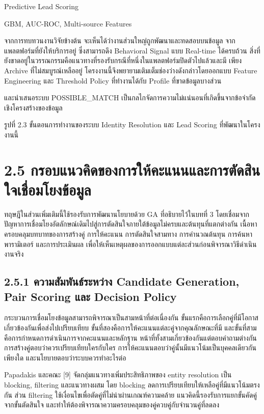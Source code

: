 \documentclass[12pt,a4paper]{report}
\begin{document}
Predictive Lead Scoring\par
GBM, AUC-ROC, Multi-source Features\par
จากการทบทวนงานวิจัยข้างต้น จะเห็นได้ว่างานส่วนใหญ่ถูกพัฒนาและทดสอบบนข้อมูล จากแพลตฟอร์มที่ยังให้บริการอยู่ ซึ่งสามารถดึง Behavioral Signal แบบ Real-time ได้ครบถ้วน สิ่งที่ยังขาดอยู่ในวรรณกรรมคือแนวทางที่รองรับกรณีที่หนึ่งในแพลตฟอร์มปิดตัวไปแล้วและมี เพียง Archive ที่ไม่สมบูรณ์เหลืออยู่ โครงงานนี้จึงพยายามเติมเต็มช่องว่างดังกล่าวโดยออกแบบ Feature Engineering และ Threshold Policy ที่ทำงานได้กับ Profile ที่ขาดข้อมูลบางส่วน\par
\clearpage
และนำเสนอระบบ POSSIBLE\_MATCH เป็นกลไกจัดการความไม่แน่นอนที่เกิดขึ้นจากข้อจำกัด เชิงโครงสร้างของข้อมูล\par
\begin{center}\small รูปที่ 2.3 ขั้นตอนการทำงานของระบบ Identity Resolution และ Lead Scoring ที่พัฒนาในโครงงานนี้\end{center}
\clearpage
\section*{2.5 กรอบแนวคิดของการให้คะแนนและการตัดสินใจเชื่อมโยงข้อมูล}
ทฤษฎีในส่วนเพิ่มเติมนี้ใช้รองรับการพัฒนานโยบายด้วย GA ที่อธิบายไว้ในบทที่ 3 โดยเชื่อมจากปัญหาการเชื่อมโยงอัตลักษณ์เดิมไปสู่การตัดสินใจภายใต้ข้อมูลไม่ครบและต้นทุนที่แตกต่างกัน เนื้อหาครอบคลุมบทบาทของการสร้างคู่ การให้คะแนน การตัดสินใจสามทาง การคำนวณต้นทุน การค้นหาพารามิเตอร์ และการประเมินผล เพื่อให้เห็นเหตุผลของการออกแบบแต่ละส่วนก่อนพิจารณาวิธีดำเนินงานจริง

\subsection*{2.5.1 ความสัมพันธ์ระหว่าง Candidate Generation, Pair Scoring และ Decision Policy}
กระบวนการเชื่อมโยงข้อมูลสามารถพิจารณาเป็นสามหน้าที่ต่อเนื่องกัน ขั้นแรกคือการเลือกคู่ที่มีโอกาสเกี่ยวข้องกันเพื่อส่งไปเปรียบเทียบ ขั้นที่สองคือการให้คะแนนแต่ละคู่จากคุณลักษณะที่มี และขั้นที่สามคือการกำหนดการดำเนินการจากคะแนนและหลักฐาน หน้าที่ทั้งสามเกี่ยวข้องกันแต่ตอบคำถามต่างกัน การสร้างคู่ตอบว่าควรเปรียบเทียบใครกับใคร การให้คะแนนตอบว่าคู่นั้นมีแนวโน้มเป็นบุคคลเดียวกันเพียงใด และนโยบายตอบว่าระบบควรทำอะไรต่อ

Papadakis และคณะ [9] จัดกลุ่มแนวทางเพิ่มประสิทธิภาพของ entity resolution เป็น blocking, filtering และแนวทางผสม โดย blocking ลดการเปรียบเทียบให้เหลือคู่ที่มีแนวโน้มตรงกัน ส่วน filtering ใช้เงื่อนไขเพื่อตัดคู่ที่ไม่น่าผ่านเกณฑ์ความคล้าย แนวคิดนี้รองรับการแยกขั้นคัดคู่จากขั้นตัดสินใจ และทำให้ต้องพิจารณาความครอบคลุมของคู่ควบคู่กับจำนวนคู่ที่ลดลง
\end{document}
